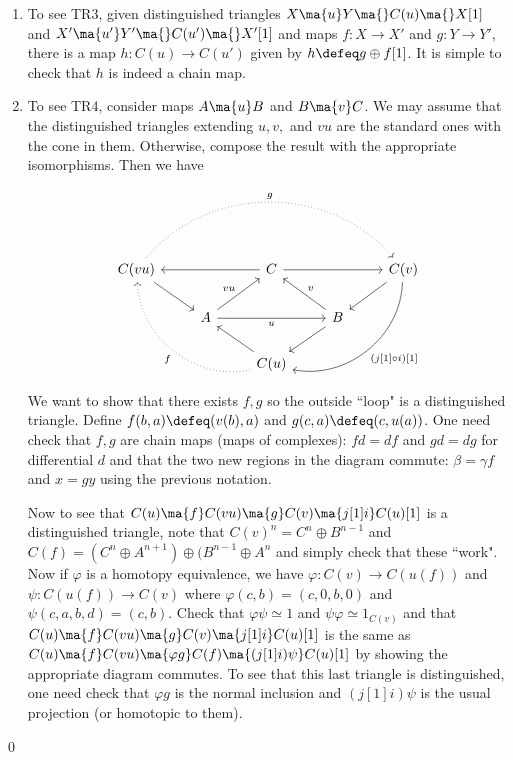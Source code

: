 \begin{enumerate}[1]
\item To see TR3, given distinguished triangles $X \ma{u} Y \ma{} C(u) \ma{} X[1]$ and $X' \ma{u'} Y' \ma{} C(u') \ma{} X'[1]$ and maps $f: X \to X'$ and $g: Y \to Y'$, there is a map $h: C(u) \to C(u')$ given by $h\defeq g \oplus f[1]$. It is simple to check that $h$ is indeed a chain map. 

\item To see TR4, consider maps $A \ma{u} B$ and $B \ma{v} C$. We may assume that the distinguished triangles extending $u,v,$ and $vu$ are the standard ones with the cone in them. Otherwise, compose the result with the appropriate isomorphisms. Then we have
\[
\begin{tikzcd}
C(vu) \arrow{dr} \arrow[dotted,bend left=50]{rrrr}{g} & & C \arrow{ll} \arrow{rr} & & C(v) \arrow{dl} \arrow[bend left=50]{ddll}{(j[1] \circ i)[1]} \\
& A \arrow[swap]{rr}{u} \arrow{ur}{vu} & & B  \arrow{dl} \arrow[swap]{ul}{v} & \\
& & C(u) \arrow[dotted,bend left=50]{uull}{f} \arrow{ul} & & 
\end{tikzcd}
\]
We want to show that there exists $f,g$ so the outside ``loop" is a distinguished triangle. Define $f(b,a) \defeq (v(b),a)$ and $g(c,a) \defeq (c,u(a))$. One need check that $f,g$ are chain maps (maps of complexes): $fd=df$ and $gd=dg$ for differential $d$ and that the two new regions in the diagram commute: $\beta=\gamma f$ and $x=gy$ using the previous notation. 

Now to see that $C(u) \ma{f} C(vu) \ma{g} C(v) \ma{j[1]i} C(u)[1]$ is a distinguished triangle, note that $C(v)^n=C^n \oplus B^{n-1}$ and $C(f)=(C^n \oplus A^{n+1}) \oplus (B^{n-1} \oplus A^n$ and simply check that these ``work". Now if $\varphi$ is a homotopy equivalence, we have $\varphi: C(v) \to C(u(f))$ and $\psi: C(u(f)) \to C(v)$ where $\varphi(c,b)=(c,0,b,0)$ and $\psi(c,a,b,d)=(c,b)$. Check that $\varphi \psi \simeq 1$ and $\psi \varphi \simeq 1_{C(v)}$ and that $C(u) \ma{f} C(vu) \ma{g} C(v) \ma{j[1]i} C(u)[1]$ is the same as $C(u) \ma{f} C(vu) \ma{\varphi g} C(f) \ma{(j[1]i)\psi} C(u)[1]$ by showing the appropriate diagram commutes. To see that this last triangle is distinguished, one need check that $\varphi g$ is the normal inclusion and $(j[1]i)\psi$ is the usual projection (or homotopic to them). 
\end{enumerate}
\qed \\




